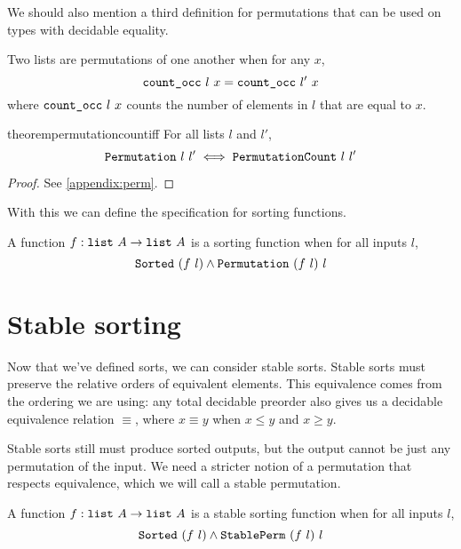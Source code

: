 \documentclass[sigplan,10pt,anonymous,review]{thesis}
\begin{document}
We should also mention a third definition for permutations that can be
used on types with decidable equality.
\begin{definition}[PermutationCount]
  \label{def:permutation_count}
  Two lists are permutations of one another when for any $x$,
  \begin{equation*}
    \texttt{\textup{count\_occ}}~l~x = \texttt{\textup{count\_occ}}~l'~x
  \end{equation*}
  where $\texttt{\textup{count\_occ}}~l~x$ counts the number of elements in $l$
  that are equal to $x$.
\end{definition}

\begin{restatable}{theorem}{permutationcountiff}
  \label{thm:permutationcount_iff}
  For all lists $l$ and $l'$,
  \begin{equation*}
    \texttt{\textup{Permutation}}~l~l' \iff \texttt{\textup{PermutationCount}}~l~l'
  \end{equation*}
\end{restatable}
\begin{proof}
  See \cref{appendix:perm}.
\end{proof}

With this we can define the specification for sorting functions.
\begin{definition}[Sort]
  \label{def:sort}
  A function $f : \texttt{\textup{list}}~A \to \texttt{\textup{list}}~A$ is a sorting function
  when for all inputs $l$,
  \begin{equation*}
    \texttt{\textup{Sorted}}~(f~l) \land \texttt{\textup{Permutation}}~(f~l)~l
  \end{equation*}
\end{definition}

\section{Stable sorting}
\label{sec:stable_sorting}

Now that we've defined sorts, we can consider stable sorts. Stable
sorts must preserve the relative orders of equivalent elements. This
equivalence comes from the ordering we are using: any total decidable
preorder also gives us a decidable equivalence relation $\equiv$, where $x
\equiv y$ when $x \le y$ and $x \ge y$.

Stable sorts still must produce sorted outputs, but the output cannot
be just any permutation of the input. We need a stricter notion of
a permutation that respects equivalence, which we will call a stable
permutation.
\begin{definition}[StableSort]
  A function $f : \texttt{\textup{list}}~A \to \texttt{\textup{list}}~A$ is a stable sorting
  function when for all inputs $l$,
  \begin{equation*}
    \texttt{\textup{Sorted}}~(f~l) \land \texttt{\textup{StablePerm}}~(f~l)~l
  \end{equation*}
\end{definition}
\end{document}

